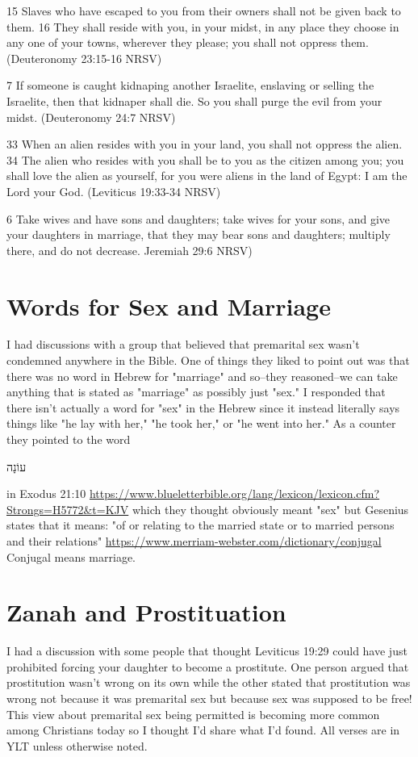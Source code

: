 \documentclass[11pt]{article}
\begin{document}
{15 Slaves who have escaped to you from their owners shall not be given back to them. 16 They shall reside with you, in your midst, in any place they choose in any one of your towns, wherever they please; you shall not oppress them. (Deuteronomy 23:15-16 NRSV)


7 If someone is caught kidnaping another Israelite, enslaving or selling the Israelite, then that kidnaper shall die. So you shall purge the evil from your midst. (Deuteronomy 24:7 NRSV)


33 When an alien resides with you in your land, you shall not oppress the alien. 34 The alien who resides with you shall be to you as the citizen among you; you shall love the alien as yourself, for you were aliens in the land of Egypt: I am the Lord your God. (Leviticus 19:33-34 NRSV)


6 Take wives and have sons and daughters; take wives for your sons, and give your daughters in marriage, that they may bear sons and daughters; multiply there, and do not decrease. Jeremiah 29:6 NRSV)


\section{Words for Sex and Marriage}
I had discussions with a group that believed that premarital sex wasn't condemned anywhere in the Bible. One of things they liked to point out was that there was no word in Hebrew for "marriage" and so--they reasoned--we can take anything that is stated as "marriage" as possibly just "sex." I responded that there isn't actually a word for "sex" in the Hebrew since it instead literally says things like "he lay with her," "he took her," or "he went into her." As a counter they pointed to the word \begin{hebrew}  עוֹנָה  \end{hebrew} in Exodus 21:10 \url{https://www.blueletterbible.org/lang/lexicon/lexicon.cfm?Strongs=H5772&t=KJV} which they thought obviously meant "sex" but Gesenius states that it means:  "of or relating to the married state or to married persons and their relations" \url{https://www.merriam-webster.com/dictionary/conjugal} Conjugal means marriage.

\section{Zanah and Prostituation}
I had a discussion with some people that thought Leviticus 19:29 could have just prohibited forcing your daughter to become a prostitute. One person argued that prostitution wasn’t wrong on its own while the other stated that prostitution was wrong not because it was premarital sex but because sex was supposed to be free! This view about premarital sex being permitted is becoming more common among Christians today so I thought I’d share what I’d found. All verses are in YLT unless otherwise noted.

}
\end{document}
